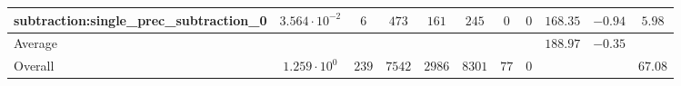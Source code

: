 \begin{tabular}{|l|c|c|c|c|c|c|c|c|c|c|}
subtraction:single\_prec\_subtraction\_0         & $ 3.564 \cdot 10^{-2} $ & $ 6      $ & $ 473  $ & $ 161  $ & $ 245   $ & $ 0  $ & $ 0 $ & $ 168.35      $ & $ -0.94   $ & $ 5.98    $ \\
\hline
Average                                          & $                     $ & $        $ & $      $ & $      $ & $       $ & $    $ & $   $ & $ 188.97      $ & $ -0.35   $ & $         $ \\
\hline
Overall                                          & $ 1.259 \cdot 10^{0}  $ & $ 239    $ & $ 7542 $ & $ 2986 $ & $ 8301  $ & $ 77 $ & $ 0 $ & $             $ & $         $ & $ 67.08   $ \\
\hline
\end{tabular}
